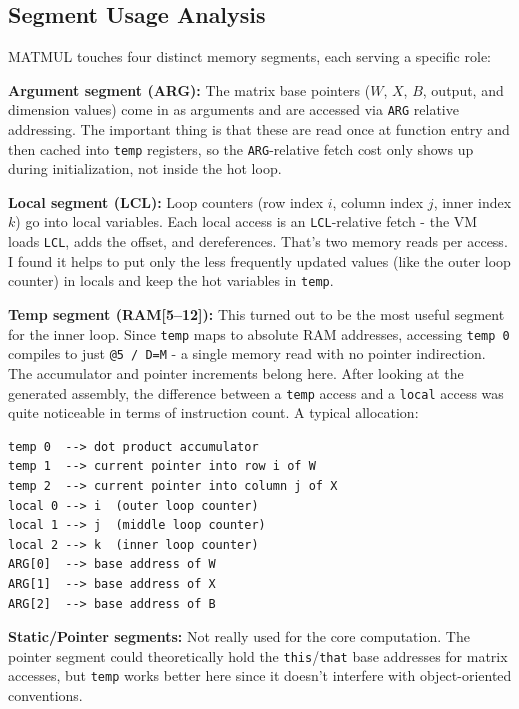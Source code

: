 \documentclass[12pt,a4paper]{article}
\begin{document}
\subsection{Segment Usage Analysis}

MATMUL touches four distinct memory segments, each serving a specific role:

\textbf{Argument segment (ARG):} The matrix base pointers ($W$, $X$, $B$, output, and dimension values) come in as arguments and are accessed via \texttt{ARG} relative addressing. The important thing is that these are read once at function entry and then cached into \texttt{temp} registers, so the \texttt{ARG}-relative fetch cost only shows up during initialization, not inside the hot loop.

\textbf{Local segment (LCL):} Loop counters (row index $i$, column index $j$, inner index $k$) go into local variables. Each local access is an \texttt{LCL}-relative fetch - the VM loads \texttt{LCL}, adds the offset, and dereferences. That's two memory reads per access. I found it helps to put only the less frequently updated values (like the outer loop counter) in locals and keep the hot variables in \texttt{temp}.

\textbf{Temp segment (RAM[5--12]):} This turned out to be the most useful segment for the inner loop. Since \texttt{temp} maps to absolute RAM addresses, accessing \texttt{temp 0} compiles to just \texttt{@5 / D=M} - a single memory read with no pointer indirection. The accumulator and pointer increments belong here. After looking at the generated assembly, the difference between a \texttt{temp} access and a \texttt{local} access was quite noticeable in terms of instruction count. A typical allocation:

\begin{lstlisting}[style=pseudo, caption={Segment allocation for MATMUL}]
temp 0  --> dot product accumulator
temp 1  --> current pointer into row i of W
temp 2  --> current pointer into column j of X
local 0 --> i  (outer loop counter)
local 1 --> j  (middle loop counter)
local 2 --> k  (inner loop counter)
ARG[0]  --> base address of W
ARG[1]  --> base address of X
ARG[2]  --> base address of B
\end{lstlisting}

\textbf{Static/Pointer segments:} Not really used for the core computation. The pointer segment could theoretically hold the \texttt{this}/\texttt{that} base addresses for matrix accesses, but \texttt{temp} works better here since it doesn't interfere with object-oriented conventions.
\end{document}
